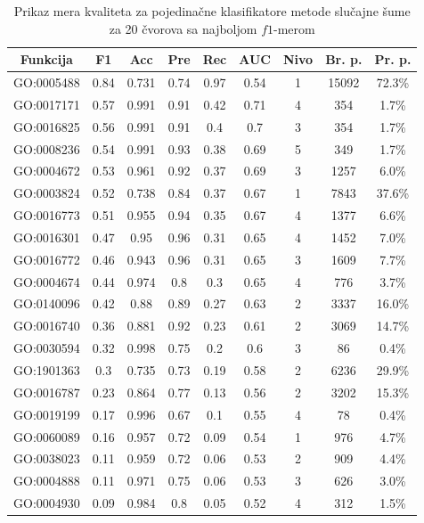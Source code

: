 \begin{table}[h]
	\centering
	\begin{tabular}{|c|c|c|c|c|c|c|c|c|}
		\hline
		Funkcija & F1 & Acc & Pre & Rec & AUC & Nivo & Br. p. & Pr. p. \\
		\hline
		GO:0005488 & 0.84 & 0.731 & 0.74 & 0.97 & 0.54 & 1 & 15092 & 72.3\% \\
		\hline
		GO:0017171 & 0.57 & 0.991 & 0.91 & 0.42 & 0.71 & 4 & 354 & 1.7\% \\
		\hline
		GO:0016825 & 0.56 & 0.991 & 0.91 & 0.4 & 0.7 & 3 & 354 & 1.7\% \\
		\hline
		GO:0008236 & 0.54 & 0.991 & 0.93 & 0.38 & 0.69 & 5 & 349 & 1.7\% \\
		\hline
		GO:0004672 & 0.53 & 0.961 & 0.92 & 0.37 & 0.69 & 3 & 1257 & 6.0\% \\
		\hline
		GO:0003824 & 0.52 & 0.738 & 0.84 & 0.37 & 0.67 & 1 & 7843 & 37.6\% \\
		\hline
		GO:0016773 & 0.51 & 0.955 & 0.94 & 0.35 & 0.67 & 4 & 1377 & 6.6\% \\
		\hline
		GO:0016301 & 0.47 & 0.95 & 0.96 & 0.31 & 0.65 & 4 & 1452 & 7.0\% \\
		\hline
		GO:0016772 & 0.46 & 0.943 & 0.96 & 0.31 & 0.65 & 3 & 1609 & 7.7\% \\
		\hline
		GO:0004674 & 0.44 & 0.974 & 0.8 & 0.3 & 0.65 & 4 & 776 & 3.7\% \\
		\hline
		GO:0140096 & 0.42 & 0.88 & 0.89 & 0.27 & 0.63 & 2 & 3337 & 16.0\% \\
		\hline
		GO:0016740 & 0.36 & 0.881 & 0.92 & 0.23 & 0.61 & 2 & 3069 & 14.7\% \\
		\hline
		GO:0030594 & 0.32 & 0.998 & 0.75 & 0.2 & 0.6 & 3 & 86 & 0.4\% \\
		\hline
		GO:1901363 & 0.3 & 0.735 & 0.73 & 0.19 & 0.58 & 2 & 6236 & 29.9\% \\
		\hline
		GO:0016787 & 0.23 & 0.864 & 0.77 & 0.13 & 0.56 & 2 & 3202 & 15.3\% \\
		\hline
		GO:0019199 & 0.17 & 0.996 & 0.67 & 0.1 & 0.55 & 4 & 78 & 0.4\% \\
		\hline
		GO:0060089 & 0.16 & 0.957 & 0.72 & 0.09 & 0.54 & 1 & 976 & 4.7\% \\
		\hline
		GO:0038023 & 0.11 & 0.959 & 0.72 & 0.06 & 0.53 & 2 & 909 & 4.4\% \\
		\hline
		GO:0004888 & 0.11 & 0.971 & 0.75 & 0.06 & 0.53 & 3 & 626 & 3.0\% \\
		\hline
		GO:0004930 & 0.09 & 0.984 & 0.8 & 0.05 & 0.52 & 4 & 312 & 1.5\% \\
		\hline
	\end{tabular}
	\caption{Prikaz mera kvaliteta za pojedina\v cne klasifikatore metode slučajne šume za 20 \v cvorova sa najboljom $f1$-merom}
	\label{tab: rfF1}
\end{table}


